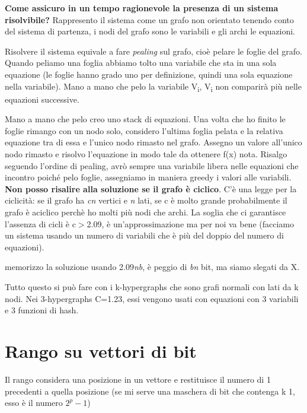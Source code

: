 \documentclass[12pt,italian]{report}
\begin{document}
\bigbreak
\noindent \textbf{Come assicuro in un tempo ragionevole la presenza di un sistema risolvibile?}
\noindent Rappresento il sistema come un grafo non orientato tenendo conto del sistema di partenza, i nodi del grafo sono le variabili e gli archi le equazioni. 
\vspace{50mm}

\noindent Risolvere il sistema equivale a fare \textit{pealing} sul grafo, cioè pelare le foglie del grafo. Quando peliamo una foglia abbiamo tolto una variabile che sta in una sola equazione (le foglie hanno grado uno per definizione, quindi una sola equazione nella variabile). Mano a mano che pelo la variabile V\textsubscript{i}, V\textsubscript{i} non comparirà più nelle equazioni successive. 

Mano a mano che pelo creo uno stack di equazioni.
Una volta che ho finito le foglie rimango con un nodo solo, considero l'ultima foglia pelata e la relativa equazione tra di essa e l'unico nodo rimasto nel grafo. Assegno un valore all'unico nodo rimasto e risolvo l'equazione in modo tale da ottenere f(x) nota. Risalgo seguendo l'ordine di pealing, avrò sempre una variabile libera nelle equazioni che incontro poiché pelo foglie, assegniamo in maniera greedy i valori alle variabili.
\bigbreak
\noindent \textbf{Non posso risalire alla soluzione se il grafo è ciclico}. C'è una legge per la ciclicità: se il grafo ha \textit{cn} vertici e \textit{n} lati, se c è molto grande probabilmente il grafo è aciclico perchè ho molti più nodi che archi. La soglia che ci garantisce l'assenza di cicli è c$>$2.09, è un'approssimazione ma per noi va bene (facciamo un sistema usando un numero di variabili che è più del doppio del numero di equazioni). 

\noindent memorizzo la soluzione usando 2.09\textit{nb}, è peggio di \textit{bn} bit, ma siamo slegati da X.

\noindent Tutto questo si può fare con i k-hypergraphs che sono grafi normali con lati da k nodi. 
Nei 3-hypergraphs C=1.23, essi vengono usati con equazioni con 3 variabili e 3 funzioni di hash. 

\section{Rango su vettori di bit}
\label{rangosuvettoridibit}
Il rango considera  una posizione in un vettore e restituisce il numero di 1 precedenti a quella posizione (se mi serve una maschera di bit che contenga k 1, esso è il numero $2^{p}-1$)
\end{document}
